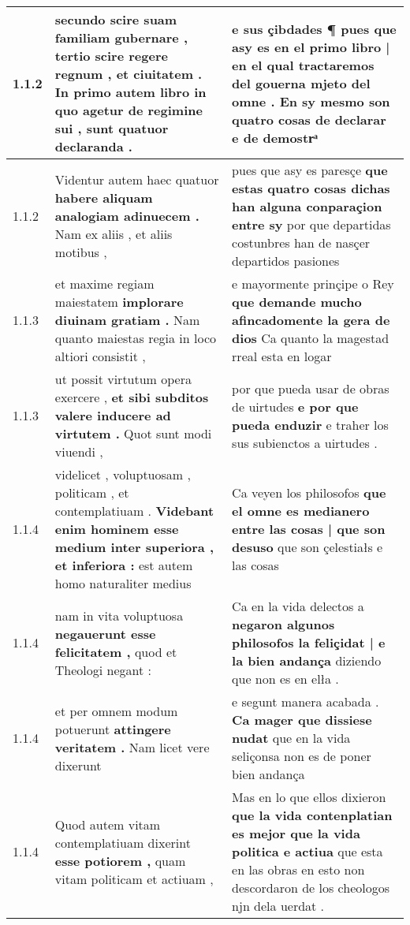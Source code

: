 \begin{tabular}{|p{1cm}|p{6.5cm}|p{6.5cm}|}

\hline
1.1.2 & secundo scire suam familiam gubernare , \textbf{ tertio scire regere regnum , et ciuitatem . In primo autem libro in quo agetur de regimine sui , } sunt quatuor declaranda . & e sus çibdades ¶ \textbf{ pues que asy es en el primo libro | en el qual tractaremos del gouerna mjeto del omne . } En sy mesmo son quatro cosas de declarar e de demostrͣ \\\hline
1.1.2 & Videntur autem haec quatuor \textbf{ habere aliquam analogiam adinuecem . } Nam ex aliis , et aliis motibus , & pues que asy es paresçe \textbf{ que estas quatro cosas dichas han alguna conparaçion entre sy } por que departidas costunbres han de nasçer departidos pasiones \\\hline
1.1.3 & et maxime regiam maiestatem \textbf{ implorare diuinam gratiam . } Nam quanto maiestas regia in loco altiori consistit , & e mayormente prinçipe o Rey \textbf{ que demande mucho afincadomente la gera de dios } Ca quanto la magestad rreal esta en logar \\\hline
1.1.3 & ut possit virtutum opera exercere , \textbf{ et sibi subditos valere inducere ad virtutem . } Quot sunt modi viuendi , & por que pueda usar de obras de uirtudes \textbf{ e por que pueda enduzir } e traher los sus subienctos a uirtudes . \\\hline
1.1.4 & videlicet , voluptuosam , politicam , et contemplatiuam . \textbf{ Videbant enim hominem esse medium inter superiora , et inferiora : } est autem homo naturaliter medius & Ca veyen los philosofos \textbf{ que el omne es medianero entre las cosas | que son desuso } que son çelestiałs e las cosas \\\hline
1.1.4 & nam in vita voluptuosa \textbf{ negauerunt esse felicitatem , } quod et Theologi negant : & Ca en la vida delectos a \textbf{ negaron algunos philosofos la feliçidat | e la bien andança } diziendo que non es en elła . \\\hline
1.1.4 & et per omnem modum potuerunt \textbf{ attingere veritatem . } Nam licet vere dixerunt & e segunt manera acabada . \textbf{ Ca mager que dissiese nudat } que en la vida seliçonsa non es de poner bien andança \\\hline
1.1.4 & Quod autem vitam contemplatiuam dixerint \textbf{ esse potiorem , } quam vitam politicam et actiuam , & Mas en lo que ellos dixieron \textbf{ que la vida contenplatian es mejor que la vida politica e actiua } que esta en las obras en esto non descordaron de los cheologos njn dela uerdat . \\\hline

\end{tabular}
